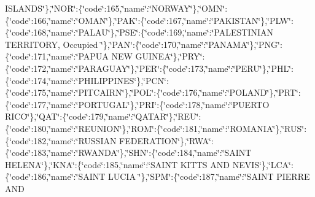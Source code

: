 \begin{DoxyCompactItemize}
I\-S\-L\-A\-N\-D\-S\char`\"{}\},\char`\"{}N\-O\-R\char`\"{}\-:\{\char`\"{}code\char`\"{}\-:165,\char`\"{}name\char`\"{}\-:\char`\"{}N\-O\-R\-W\-A\-Y\char`\"{}\},\char`\"{}O\-M\-N\char`\"{}\-:\{\char`\"{}code\char`\"{}\-:166,\char`\"{}name\char`\"{}\-:\char`\"{}O\-M\-A\-N\char`\"{}\},\char`\"{}P\-A\-K\char`\"{}\-:\{\char`\"{}code\char`\"{}\-:167,\char`\"{}name\char`\"{}\-:\char`\"{}P\-A\-K\-I\-S\-T\-A\-N\char`\"{}\},\char`\"{}P\-L\-W\char`\"{}\-:\{\char`\"{}code\char`\"{}\-:168,\char`\"{}name\char`\"{}\-:\char`\"{}P\-A\-L\-A\-U\char`\"{}\},\char`\"{}P\-S\-E\char`\"{}\-:\{\char`\"{}code\char`\"{}\-:169,\char`\"{}name\char`\"{}\-:\char`\"{}P\-A\-L\-E\-S\-T\-I\-N\-I\-A\-N T\-E\-R\-R\-I\-T\-O\-R\-Y, Occupied \char`\"{}\},\char`\"{}P\-A\-N\char`\"{}\-:\{\char`\"{}code\char`\"{}\-:170,\char`\"{}name\char`\"{}\-:\char`\"{}P\-A\-N\-A\-M\-A\char`\"{}\},\char`\"{}P\-N\-G\char`\"{}\-:\{\char`\"{}code\char`\"{}\-:171,\char`\"{}name\char`\"{}\-:\char`\"{}P\-A\-P\-U\-A N\-E\-W G\-U\-I\-N\-E\-A\char`\"{}\},\char`\"{}P\-R\-Y\char`\"{}\-:\{\char`\"{}code\char`\"{}\-:172,\char`\"{}name\char`\"{}\-:\char`\"{}P\-A\-R\-A\-G\-U\-A\-Y\char`\"{}\},\char`\"{}P\-E\-R\char`\"{}\-:\{\char`\"{}code\char`\"{}\-:173,\char`\"{}name\char`\"{}\-:\char`\"{}P\-E\-R\-U\char`\"{}\},\char`\"{}P\-H\-L\char`\"{}\-:\{\char`\"{}code\char`\"{}\-:174,\char`\"{}name\char`\"{}\-:\char`\"{}P\-H\-I\-L\-I\-P\-P\-I\-N\-E\-S\char`\"{}\},\char`\"{}P\-C\-N\char`\"{}\-:\{\char`\"{}code\char`\"{}\-:175,\char`\"{}name\char`\"{}\-:\char`\"{}P\-I\-T\-C\-A\-I\-R\-N\char`\"{}\},\char`\"{}P\-O\-L\char`\"{}\-:\{\char`\"{}code\char`\"{}\-:176,\char`\"{}name\char`\"{}\-:\char`\"{}P\-O\-L\-A\-N\-D\char`\"{}\},\char`\"{}P\-R\-T\char`\"{}\-:\{\char`\"{}code\char`\"{}\-:177,\char`\"{}name\char`\"{}\-:\char`\"{}P\-O\-R\-T\-U\-G\-A\-L\char`\"{}\},\char`\"{}P\-R\-I\char`\"{}\-:\{\char`\"{}code\char`\"{}\-:178,\char`\"{}name\char`\"{}\-:\char`\"{}P\-U\-E\-R\-T\-O R\-I\-C\-O\char`\"{}\},\char`\"{}Q\-A\-T\char`\"{}\-:\{\char`\"{}code\char`\"{}\-:179,\char`\"{}name\char`\"{}\-:\char`\"{}Q\-A\-T\-A\-R\char`\"{}\},\char`\"{}R\-E\-U\char`\"{}\-:\{\char`\"{}code\char`\"{}\-:180,\char`\"{}name\char`\"{}\-:\char`\"{}R\-E\-U\-N\-I\-O\-N\char`\"{}\},\char`\"{}R\-O\-M\char`\"{}\-:\{\char`\"{}code\char`\"{}\-:181,\char`\"{}name\char`\"{}\-:\char`\"{}R\-O\-M\-A\-N\-I\-A\char`\"{}\},\char`\"{}R\-U\-S\char`\"{}\-:\{\char`\"{}code\char`\"{}\-:182,\char`\"{}name\char`\"{}\-:\char`\"{}R\-U\-S\-S\-I\-A\-N F\-E\-D\-E\-R\-A\-T\-I\-O\-N\char`\"{}\},\char`\"{}R\-W\-A\char`\"{}\-:\{\char`\"{}code\char`\"{}\-:183,\char`\"{}name\char`\"{}\-:\char`\"{}R\-W\-A\-N\-D\-A\char`\"{}\},\char`\"{}S\-H\-N\char`\"{}\-:\{\char`\"{}code\char`\"{}\-:184,\char`\"{}name\char`\"{}\-:\char`\"{}S\-A\-I\-N\-T H\-E\-L\-E\-N\-A\char`\"{}\},\char`\"{}K\-N\-A\char`\"{}\-:\{\char`\"{}code\char`\"{}\-:185,\char`\"{}name\char`\"{}\-:\char`\"{}S\-A\-I\-N\-T K\-I\-T\-T\-S A\-N\-D N\-E\-V\-I\-S\char`\"{}\},\char`\"{}L\-C\-A\char`\"{}\-:\{\char`\"{}code\char`\"{}\-:186,\char`\"{}name\char`\"{}\-:\char`\"{}S\-A\-I\-N\-T L\-U\-C\-I\-A \char`\"{}\},\char`\"{}S\-P\-M\char`\"{}\-:\{\char`\"{}code\char`\"{}\-:187,\char`\"{}name\char`\"{}\-:\char`\"{}S\-A\-I\-N\-T P\-I\-E\-R\-R\-E A\-N\-D 
\end{DoxyCompactItemize}

